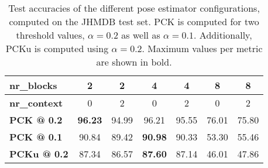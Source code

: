 \begin{table}[]
    \small
    \centering
    \begin{tabular}{|l|c|c|c|c|c|c|}
    \hline
        \textbf{nr\_blocks} & 2 & 2 & 4 & 4 & 8 & 8 \\ \hline
        \textbf{nr\_context} & 0 & 2 & 0 & 2 & 0 & 2 \\ \hline
        \textbf{PCK @ 0.2} & \textbf{96.23} & 94.99 & 96.21 & 95.55 & 76.01 & 75.80 \\ \hline
        \textbf{PCK @ 0.1} & 90.84 & 89.42 & \textbf{90.98} & 90.33 & 53.30 & 55.46 \\ \hline
        \textbf{PCKu @ 0.2} & 87.34 & 86.57 & \textbf{87.60} & 87.14 & 46.01 & 47.86 \\ \hline
    \end{tabular}
    \caption{Test accuracies of the different pose estimator configurations, computed on the JHMDB test set. PCK is computed for two threshold values, $\alpha = 0.2$ as well as $\alpha = 0.1$. Additionally, PCKu is computed using $\alpha = 0.2$. Maximum values per metric are shown in bold.}
    \label{tab:jhmdb_results}
\end{table}


